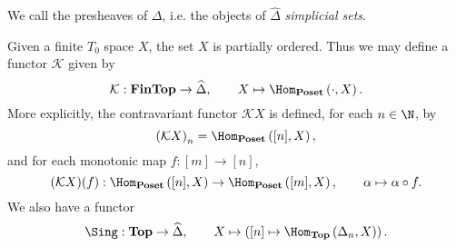 \begin{definition}
We call the presheaves of $\Delta$, i.e. the objects of $\widehat{\Delta}$ \emph{simplicial sets}.
\end{definition}

Given a finite $T_0$ space $X$, the set $X$ is partially ordered. Thus we may define a functor $\mathcal{K}$ given by
\[ \mathcal{K} : \mathbf{FinTop} \to \widehat{\Delta}, \qquad X \mapsto \Hom_{\mathbf{Poset}}\left(\cdot, X\right). \]
More explicitly, the contravariant functor $\mathcal{K}X$ is defined, for each $n \in \N$, by
\[ \left( \mathcal{K}X \right)_n = \Hom_{\mathbf{Poset}}\left([n], X \right), \]
and for each monotonic map $f : [m] \to [n]$,
\[ (\mathcal{K}X)(f) : \Hom_{\mathbf{Poset}}\left([n], X \right) \to \Hom_{\mathbf{Poset}} \left( [m], X \right), \qquad \alpha \mapsto \alpha \circ f. \]
We also have a functor
\[ \Sing : \mathbf{Top} \to \widehat{\Delta}, \qquad X \mapsto \left( [n] \mapsto \Hom_{\mathbf{Top}}\left(\Delta_n, X\right) \right). \]
